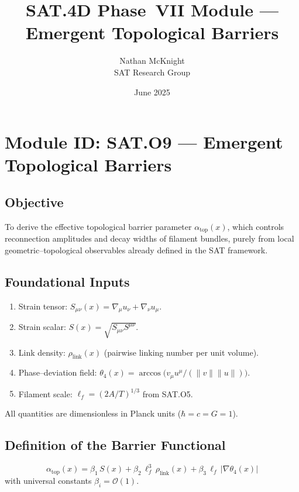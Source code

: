 \documentclass[12pt]{article}
\title{SAT.4D Phase~VII Module --- Emergent Topological Barriers}
\author{Nathan McKnight \\ \small{SAT Research Group}}
\date{June 2025}
\begin{document}
\maketitle

\section*{Module ID: \textbf{SAT.O9} --- Emergent Topological Barriers}

\subsection*{Objective}
To derive the effective topological barrier parameter $\alpha_{\text{top}}(x)$, which controls reconnection amplitudes and decay widths of filament bundles, purely from local geometric--topological observables already defined in the SAT framework.

\subsection*{Foundational Inputs}
\begin{enumerate}
    \item Strain tensor: $S_{\mu\nu}(x)=\nabla_\mu u_\nu+\nabla_\nu u_\mu$.
    \item Strain scalar: $S(x)=\sqrt{S_{\mu\nu}S^{\mu\nu}}$.
    \item Link density: $\rho_{\text{link}}(x)$ (pairwise linking number per unit volume).
    \item Phase--deviation field: $\theta_4(x)=\arccos\!\bigl(v_\mu u^\mu/(\lVert v\rVert\lVert u\rVert)\bigr)$.
    \item Filament scale: $\ell_f=(2A/T)^{1/3}$ from SAT.O5.
\end{enumerate}

All quantities are dimensionless in Planck units ($\hbar=c=G=1$).

\subsection*{Definition of the Barrier Functional}
\begin{equation}
\boxed{\;
\alpha_{\text{top}}(x)=\beta_1\,S(x)+
        \beta_2\,\ell_f^{3}\,\rho_{\text{link}}(x)+
        \beta_3\,\ell_f\,\bigl\lvert\nabla\theta_4(x)\bigr\rvert
\;}
\label{eq:alpha_def}
\end{equation}
with universal constants $\beta_i=\mathcal{O}(1)$.
\end{document}
